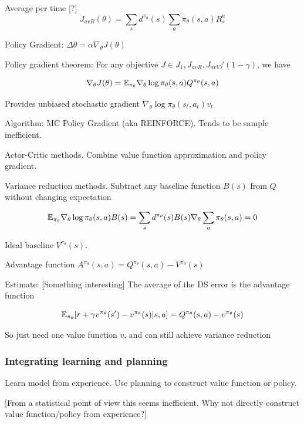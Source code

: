 \documentclass[english]{article}
\begin{document}
Average per time [?]
$$J_{avR}(\theta) 
=
\sum_s d^{\pi_\theta}(s) \sum_a \pi_\theta(s,a) R^a_s 
$$

\item Policy Gradient: $\Delta \theta = \alpha \nabla_\theta J(\theta)$

Policy gradient theorem: For any objective $J\in J_1, J_{avR}, J_{avV}/(1-\gamma)$, we have

$$\nabla_\theta J(\theta) 
=
\mathbb{E}_{\pi_\theta} \nabla_\theta \log \pi_\theta(s,a)
Q^{\pi_\theta}(s,a)
$$ 

Provides unbiased stochastic gradient $\nabla_\theta \log \pi_\theta(s_t,a_t)v_t$

Algorithm: MC Policy Gradient (aka REINFORCE). Tends to be sample inefficient.

\item Actor-Critic methods. Combine value function approximation and policy gradient. 

\item Variance reduction methods. Subtract any baseline function $B(s)$ from $Q$ without changing expectation

$$
\mathbb{E}_{\pi_\theta} \nabla_\theta \log \pi_\theta(s,a)
B(s)
=
\sum_s d^{\pi_\theta}(s) B(s)\nabla_\theta  \sum_a \pi_\theta(s,a) =0
$$ 

Ideal baseline $V^{\pi_\theta}(s)$. 

Advantage function $A^{\pi_\theta}(s,a)=Q^{\pi_\theta}(s,a)-V^{\pi_\theta}(s)$

Estimate: [Something interesting] The average of the DS error is the advantage function

$$
\mathbb{E}_{\pi_\theta}
[r+\gamma v^{\pi_\theta}(s')-v^{\pi_\theta}(s)|s,a]
=
Q^{\pi_\theta}(s,a)- v^{\pi_\theta}(s)
$$ 

So just need one value function $v$, and can still achieve variance reduction




\eenum 




\subsubsection{Integrating learning and planning}
\benum

\item Learn model from experience. Use planning to construct value function or policy.

[From a statistical point of view this seems inefficient. Why not directly construct value function/policy from experience?]
\end{document}
